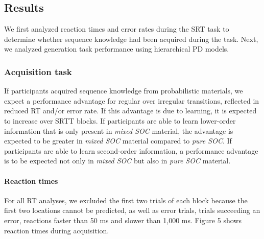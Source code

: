 \documentclass[floatsintext,man]{apa6}
\begin{document}
\subsection{Results}\label{results-1}

We first analyzed reaction times and error rates during the SRT task to
determine whether sequence knowledge had been acquired during the task.
Next, we analyzed generation task performance using hierarchical PD
models.

\subsubsection{Acquisition task}\label{acquisition-task-1}

If participants acquired sequence knowledge from probabilistic
materials, we expect a performance advantage for regular over irregular
transitions, reflected in reduced RT and/or error rate. If this
advantage is due to learning, it is expected to increase over SRTT
blocks. If participants are able to learn lower-order information that
is only present in \emph{mixed SOC} material, the advantage is expected
to be greater in \emph{mixed SOC} material compared to \emph{pure SOC}.
If participants are able to learn second-order information, a
performance advantage is to be expected not only in \emph{mixed SOC} but
also in \emph{pure SOC} material.

\paragraph{Reaction times}\label{reaction-times-1}



For all RT analyses, we excluded the first two trials of each block
because the first two locations cannot be predicted, as well as error
trials, trials succeeding an error, reactions faster than 50 ms and
slower than 1,000 ms. Figure 5 shows reaction times during acquisition.
\end{document}
